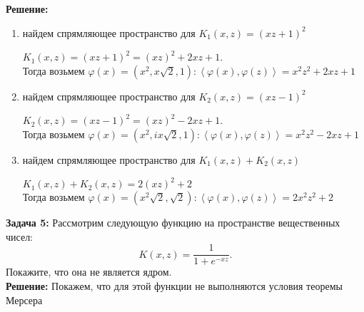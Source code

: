 \documentclass[12pt,letterpaper]{article}
\theoremstyle{definition}
\begin{document}
{\textbf{Решение:}
\begin{enumerate} 
  \item найдем спрямляющее пространство для $K_1(x, z) = (xz + 1)^2$
  \begin{itemize} 
  $K_1(x, z) = (xz + 1)^2 = (xz)^2 + 2xz + 1$. 
  \\
  Тогда возьмем $\varphi(x) = (x^2, x \sqrt{2}, 1): \left \langle \varphi(x), \varphi(z) \right \rangle = x^2 z^2 + 2xz + 1$
  \end{itemize}
  \item найдем спрямляющее пространство для $K_2(x, z) = (xz - 1)^2$
  \begin{itemize}
    $K_2(x, z) = (xz - 1)^2 = (xz)^2 - 2xz + 1$. 
  \\
  Тогда возьмем $\varphi(x) = (x^2, ix \sqrt{2}, 1): \left \langle \varphi(x), \varphi(z) \right \rangle = x^2 z^2 - 2xz + 1$
  \end{itemize}
  \item найдем спрямляющее пространство для $K_1(x, z) + K_2(x, z)$
  \begin{itemize}
  $K_1(x, z) + K_2(x, z) = 2(xz)^2 + 2$
  \\
  Тогда возьмем $\varphi(x) = (x^2\sqrt{2}, \sqrt{2}): \left \langle \varphi(x), \varphi(z) \right \rangle = 2x^2 z^2 + 2$
  \end{itemize}
\end{enumerate}

\newpage

\textbf{Задача 5:} Рассмотрим следующую функцию на пространстве вещественных чисел:
    \[
        K(x, z) = \frac{1}{1 + e^{-xz}}.
    \]
    Покажите, что она не является ядром.
\\

\textbf{Решение:} Покажем, что для этой функции не выполняются условия теоремы Мерсера

}
\end{document}
